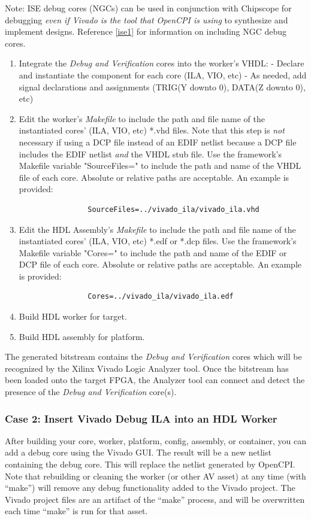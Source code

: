 \begin{flushleft}
Note: ISE debug cores (NGCs) can be used in conjunction with Chipscope for debugging \textit{even if Vivado is the tool that OpenCPI is using} to synthesize and implement designs. Reference \ref{ise1} for information on including NGC debug cores.
		\begin{enumerate}
			\item Integrate the \textit{Debug and Verification} cores into the worker's VHDL:
				\subitem - Declare and instantiate the component for each core (ILA, VIO, etc)
				\subitem - As needed, add signal declarations and assignments (TRIG(Y downto 0), DATA(Z downto 0), etc)
			\item Edit the worker's \textit{Makefile} to include the path and file name of the
			instantiated cores' (ILA, VIO, etc) *.vhd files. Note that this step is \textit{not} necessary if using a DCP file instead of an EDIF netlist because a DCP file includes the EDIF netlist \textit{and} the VHDL stub file. Use the framework's Makefile
			variable "SourceFiles=" to include the path and	name of the VHDL file of each core.
			Absolute or relative paths are acceptable. An example is provided:
			\small\begin{verbatim}
				SourceFiles=../vivado_ila/vivado_ila.vhd
			\end{verbatim}
		 	\item Edit the HDL Assembly's \textit{Makefile} to include the path and file name of
		 	the	instantiated cores' (ILA, VIO, etc) *.edf or *.dcp files. Use the framework's
		 	Makefile variable "Cores=" to include the path and name of the EDIF or DCP file of each
		 	core. Absolute or relative paths are acceptable. An example is provided:
		 	\small\begin{verbatim}
		 		Cores=../vivado_ila/vivado_ila.edf
		 	\end{verbatim}
		 	\item Build HDL worker for target.
			\item Build HDL assembly for platform.
		\end{enumerate}

		The generated bitstream contains the \textit{Debug and Verification} cores which will be recognized by the Xilinx Vivado Logic Analyzer tool. Once the bitstream has been loaded onto the target FPGA, the Analyzer tool can connect and detect the presence of the \textit{Debug and Verification} core(s).

	\subsubsection{Case 2: Insert Vivado Debug ILA into an HDL Worker}
	After building your core, worker, platform, config, assembly, or container, you can add a debug core using the Vivado GUI. The result will be a new netlist containing the debug core. This will replace the netlist generated by OpenCPI. Note that rebuilding or cleaning the worker (or other AV asset) at any time (with ``make'') will remove any debug functionality added to the Vivado project. The Vivado project files are an artifact of the ``make'' process, and will be overwritten each time ``make'' is run for that asset.\newline


\end{flushleft}
